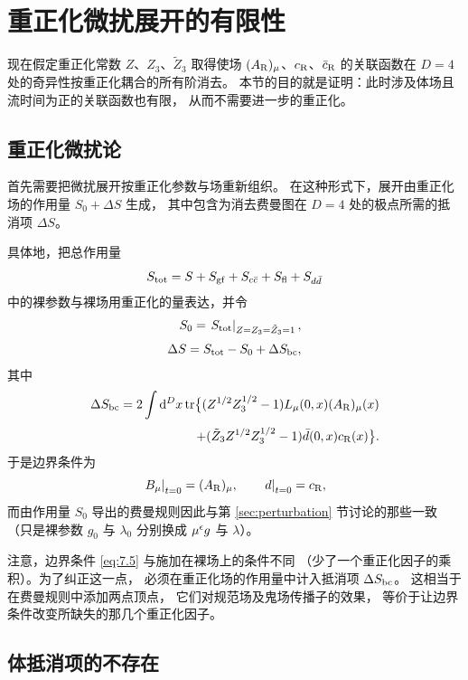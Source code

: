 \section{重正化微扰展开的有限性}\label{sec:fin}

现在假定重正化常数 $Z$、$Z_3$、$\tilde{Z}_3$
取得使场 $(A_{\mathrm{R}})_{\mu}$、$c_{\mathrm{R}}$、$\bar{c}_{\mathrm{R}}$
的关联函数在 $D=4$ 处的奇异性按重正化耦合的所有阶消去。
本节的目的就是证明：此时涉及体场且流时间为正的关联函数也有限，
从而不需要进一步的重正化。

\subsection{重正化微扰论}

首先需要把微扰展开按重正化参数与场重新组织。
在这种形式下，展开由重正化场的作用量 $S_0+\Delta S$ 生成，
其中包含为消去费曼图在 $D=4$ 处的极点所需的抵消项 $\Delta S$。

具体地，把总作用量
\begin{equation}
  S_{\mathrm{tot}}=S+S_{\mathrm{gf}}+S_{c\bar{c}}+S_{\mathrm{fl}}+S_{d\bar{d}}
  \label{eq:7.1}
\end{equation}
中的裸参数与裸场用重正化的量表达，并令
\begin{align}
  S_0=\left.S_{\mathrm{tot}}\right|_{Z=Z_3=\tilde{Z}_3=1},
  \label{eq:7.2}\\[2.5pt]
  \Delta S=S_{\mathrm{tot}}-S_0+\Delta S_{\mathrm{bc}},
  \label{eq:7.3}
\end{align}
其中
\begin{align}
   \Delta S_{\mathrm{bc}}=2\int\mathrm{d}^Dx\,\mathrm{tr}\bigl\{
   (Z^{1/2}Z_3^{1/2}-1)L_{\mu}(0,x)(A_{\mathrm{R}})_{\mu}(x)
   \notag\\[2pt]
   +
   (\tilde{Z}_3Z^{1/2}Z_3^{1/2}-1)\bar{d}(0,x)c_{\mathrm{R}}(x)\bigr\}.
   \label{eq:7.4}
\end{align}
于是边界条件为
\begin{equation}
  \left.B_{\mu}\right|_{t=0}=(A_{\mathrm{R}})_{\mu},
  \qquad
  \left.d\right|_{t=0}=c_{\mathrm{R}},
  \label{eq:7.5}
\end{equation}
而由作用量 $S_0$ 导出的费曼规则因此与第 \ref{sec:perturbation}
节讨论的那些一致
（只是裸参数 $g_0$ 与 $\lambda_0$ 分别换成 $\mu^{\epsilon}g$ 与 $\lambda$）。

注意，边界条件 \eqref{eq:7.5} 与施加在裸场上的条件不同
（少了一个重正化因子的乘积）。为了纠正这一点，
必须在重正化场的作用量中计入抵消项 $\Delta S_{\mathrm{bc}}$。
这相当于在费曼规则中添加两点顶点，
它们对规范场及鬼场传播子的效果，
等价于让边界条件改变所缺失的那几个重正化因子。

\subsection{体抵消项的不存在}\label{ssec:nobulk}

